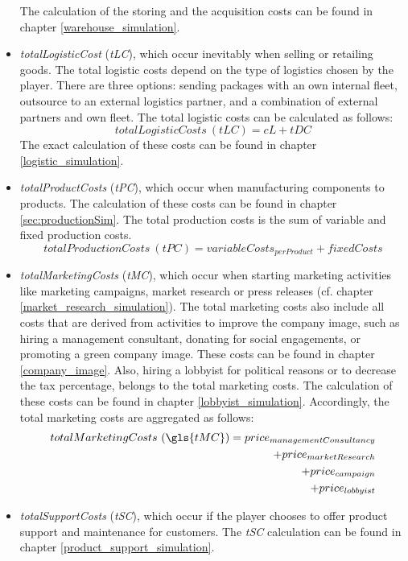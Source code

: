 \begin{itemize}
\begin{equation}
    \end{equation}
    The calculation of the storing and the acquisition costs can be found in chapter \ref{warehouse_simulation}. 
    \item \textit{totalLogisticCost} (\textit{tLC}), which occur inevitably when selling or retailing goods. The total logistic costs depend on the type of logistics chosen by the player. There are three options: sending packages with an own internal fleet, outsource to an external logistics partner, and a combination of external partners and own fleet. The total logistic costs can be calculated as follows:
    \begin{equation} 
        totalLogisticCosts~(tLC) = cL + tDC
    \end{equation}
    The exact calculation of these costs can be found in chapter \ref{logistic_simulation}.
    \item \textit{totalProductCosts} (\textit{tPC}), which occur when manufacturing components to products. The calculation of these costs can be found in chapter \ref{sec:productionSim}. The total production costs is the sum of variable and fixed production costs.
   \begin{equation}
       totalProductionCosts~(tPC) = variableCosts_{perProduct} + fixedCosts
   \end{equation}
    \item \textit{totalMarketingCosts} (\textit{tMC}), which occur when starting marketing activities like marketing campaigns, market research or press releases (cf. chapter \ref{market_research_simulation}). The total marketing costs also include all costs that are derived from activities to improve the company image, such as hiring a management consultant, donating for social engagements, or promoting a green company image. These costs can be found in chapter \ref{company_image}. Also, hiring a lobbyist for political reasons or to decrease the tax percentage, belongs to the total marketing costs. The calculation of these costs can be found in chapter \ref{lobbyist_simulation}. Accordingly, the total marketing costs are aggregated as follows:
    \begin{equation}
    \begin{split}
        totalMarketingCosts~ (\gls{tMC}) = price_{managementConsultancy} \\
        + price_{marketResearch} \\
        + price_{campaign} \\
        + price_{lobbyist} \\
    \end{split}
    \end{equation}
    \item \textit{totalSupportCosts} (\textit{tSC}), which occur if the player chooses to offer product support and maintenance for customers. The \textit{tSC} calculation can be found in chapter \ref{product_support_simulation}.
\end{itemize}


